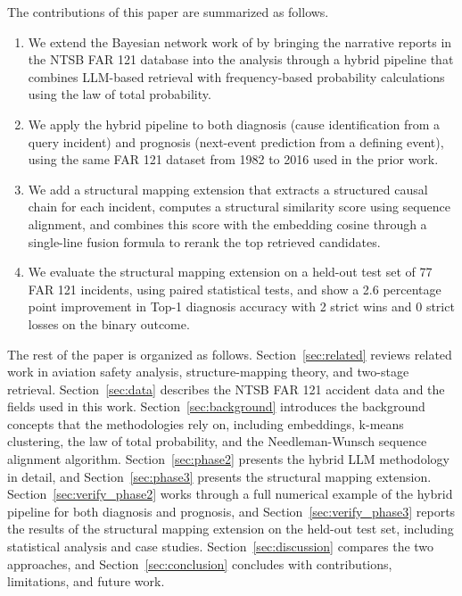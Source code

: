 \documentclass[11pt]{article}
\begin{document}
The contributions of this paper are summarized as follows.
\begin{enumerate}[leftmargin=*]
\item We extend the Bayesian network work of \citet{ZhangMahadevan2021} by bringing the narrative reports in the NTSB FAR 121 database into the analysis through a hybrid pipeline that combines LLM-based retrieval with frequency-based probability calculations using the law of total probability.
\item We apply the hybrid pipeline to both diagnosis (cause identification from a query incident) and prognosis (next-event prediction from a defining event), using the same FAR 121 dataset from 1982 to 2016 used in the prior work.
\item We add a structural mapping extension that extracts a structured causal chain for each incident, computes a structural similarity score using sequence alignment, and combines this score with the embedding cosine through a single-line fusion formula to rerank the top retrieved candidates.
\item We evaluate the structural mapping extension on a held-out test set of 77 FAR 121 incidents, using paired statistical tests, and show a 2.6 percentage point improvement in Top-1 diagnosis accuracy with 2 strict wins and 0 strict losses on the binary outcome.
\end{enumerate}

The rest of the paper is organized as follows. Section~\ref{sec:related} reviews related work in aviation safety analysis, structure-mapping theory, and two-stage retrieval. Section~\ref{sec:data} describes the NTSB FAR 121 accident data and the fields used in this work. Section~\ref{sec:background} introduces the background concepts that the methodologies rely on, including embeddings, k-means clustering, the law of total probability, and the Needleman-Wunsch sequence alignment algorithm. Section~\ref{sec:phase2} presents the hybrid LLM methodology in detail, and Section~\ref{sec:phase3} presents the structural mapping extension. Section~\ref{sec:verify_phase2} works through a full numerical example of the hybrid pipeline for both diagnosis and prognosis, and Section~\ref{sec:verify_phase3} reports the results of the structural mapping extension on the held-out test set, including statistical analysis and case studies. Section~\ref{sec:discussion} compares the two approaches, and Section~\ref{sec:conclusion} concludes with contributions, limitations, and future work.
\end{document}

